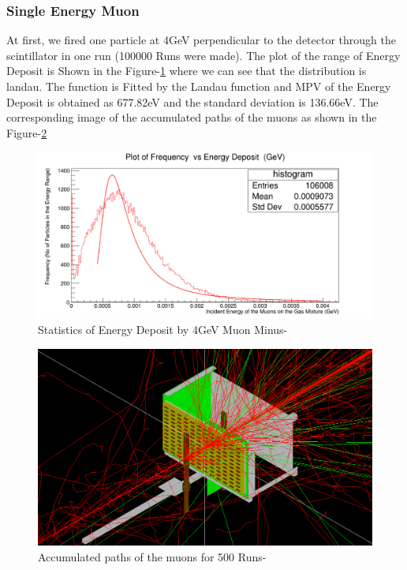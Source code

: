 \documentclass{article}
\begin{document}
\begin{multicols}{2}
\subsubsection{Single Energy Muon}

At first, we fired one particle at 4GeV perpendicular
to the detector through the scintillator in one run (100000 Runs were made). The plot of the range of
Energy Deposit is Shown in the Figure-\ref{ED4GeV} where we can see
that the distribution is landau. The function is Fitted by the
Landau function and MPV of the Energy Deposit is obtained as 677.82eV and the standard deviation
is 136.66eV. The corresponding image of the accumulated paths of the muons
as shown in the Figure-\ref{ED4GeVaccu}
\begin{figure}[H]
    \centering	
     \includegraphics[width=\columnwidth]{ED4GeV.png}
     \caption{Statistics of Energy Deposit by 4GeV Muon Minus-\cite{ROOT}}
     \label{ED4GeV}
\end{figure}

\begin{figure}[H]
    \centering	
     \includegraphics[width=\columnwidth]{ED4GeVaccu.png}
     \caption{Accumulated paths of the muons for 500 Runs-\cite{agostinelli2003geant4}}
     \label{ED4GeVaccu}
\end{figure}



\end{multicols}
\end{document}
